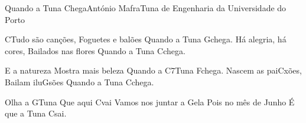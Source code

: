 \begin{musica}{Quando a Tuna Chega}{António Mafra}{Tuna de Engenharia da Universidade do Porto}

\ac{C}{Tu}do são canções,
Foguetes e balões
Quando a Tuna \ac{G}{che}ga.
Há alegria, há cores,
Bailados nas flores
Quando a Tuna \ac{C}{che}ga.

E a natureza
Mostra mais beleza
Quando a \ac{C7}{Tu}na \ac{F}{che}ga.
Nascem as pai\ac{C}{xões},
Bailam ilu\ac{G}{sões}
Quando a Tuna \ac{C}{che}ga.

Olha a \ac{G}{Tu}na
Que aqui \ac{C}{vai}
Vamos nos juntar a \ac{G}{ela}
Pois no mês de Junho
É que a Tuna \ac{C}{sai}.

\end{musica}
